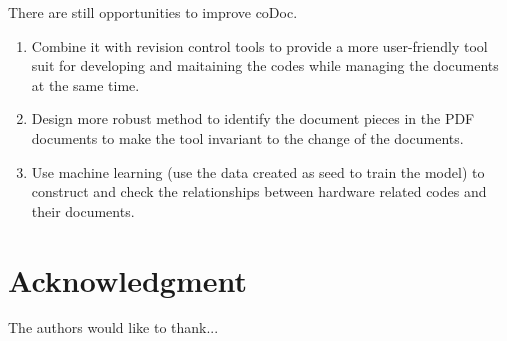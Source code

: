 \documentclass[conference]{IEEEtran}
\begin{document}
There are still opportunities to improve coDoc.
\begin{enumerate}
\item Combine it with revision control tools to provide a more user-friendly tool suit for developing and maitaining the codes while managing the documents at the same time.
\item Design more robust method to identify the document pieces in the PDF documents to make the tool invariant to the change of the documents.
\item Use machine learning (use the data created as seed to train the model) to construct and check the relationships between hardware related codes and their documents.
\end{enumerate}





\section*{Acknowledgment}


The authors would like to thank...







%
%



\end{document}
